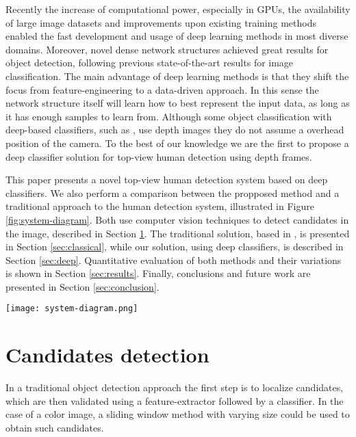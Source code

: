   Recently the increase of computational power, especially in GPUs, the availability of large image datasets and improvements upon existing training methods \cite{nair2010relu} enabled the fast development and usage of deep learning methods in most diverse domains. Moreover, novel dense network structures \cite{NIPS2013_5207} achieved great results for object detection, following previous state-of-the-art results \cite{hintonCONVNET} for image classification. The main advantage of deep learning methods is that they shift the focus from feature-engineering to a data-driven approach. In this sense the network structure itself will learn how to best represent the input data, as long as it has enough samples to learn from. Although some object classification with deep-based classifiers, such as \cite{thornberg2015combining}, use depth images they do not assume a overhead position of the camera. To the best of our knowledge we are the first to propose a deep classifier solution for top-view human detection using depth frames.

  This paper presents a novel top-view human detection system based on deep classifiers. We also perform a comparison between the propposed method and a traditional approach to the human detection system, illustrated in Figure \ref{fig:system-diagram}. Both use computer vision techniques to detect candidates in the image, described in Section \ref{sec:candidates}. The traditional solution, based in \cite{rauter}, is presented in Section \ref{sec:classical}, while our solution, using deep classifiers, is described in Section \ref{sec:deep}. Quantitative evaluation of both methods and their variations is shown in Section \ref{sec:results}. Finally, conclusions and future work are presented in Section \ref{sec:conclusion}.

  \begin{figure*}[!t]
  \centering
  \texttt{[image: system-diagram.png]}
  \caption{Human detection system diagram.}
  \label{fig:system-diagram}
  \end{figure*}

\section{Candidates detection}
\label{sec:candidates}

    In a traditional object detection approach \cite{traditional-objdetect} the first step is to localize candidates, which are then validated using a feature-extractor followed by a classifier. In the case of a color image, a sliding window method with varying size could be used to obtain such candidates.

